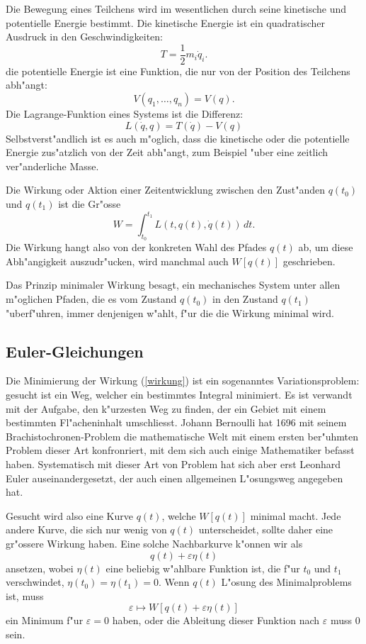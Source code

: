 Die Bewegung eines Teilchens wird im wesentlichen durch seine 
kinetische und potentielle Energie bestimmt. Die kinetische Energie
ist ein quadratischer Ausdruck in den Geschwindigkeiten:
\[
T=\frac12m_i\dot q_i.
\]
die potentielle Energie ist eine Funktion, die nur von der
Position des Teilchens abh"angt:
\[
V(q_1,\dots,q_n)=V(q).
\]
Die Lagrange-Funktion eines Systems ist die Differenz:
\[
L(\dot q, q) = T(\dot q) - V(q)
\]
Selbstverst"andlich ist es auch m"oglich, dass die kinetische oder
die potentielle Energie
zus"atzlich von der Zeit abh"angt, zum Beispiel "uber eine
zeitlich ver"anderliche Masse.

Die Wirkung oder Aktion einer Zeitentwicklung zwischen den Zust"anden
$q(t_0)$ und $q(t_1)$ ist die Gr"osse
\begin{equation}
W=\int_{t_0}^{t_1} L(t, q(t), \dot q(t))\,dt.
\label{wirkung}
\end{equation}
Die Wirkung hangt also von der konkreten Wahl des Pfades $q(t)$ ab,
um diese Abh"angigkeit auszudr"ucken, wird manchmal auch $W[q(t)]$
geschrieben.

Das Prinzip minimaler Wirkung besagt, ein mechanisches System unter
allen m"oglichen Pfaden, die es vom Zustand $q(t_0)$ in den Zustand
$q(t_1)$ "uberf"uhren, immer denjenigen w"ahlt, f"ur die die
Wirkung minimal wird.

\subsection{Euler-Gleichungen}
Die Minimierung der Wirkung (\ref{wirkung}) ist ein sogenanntes
Variationsproblem: gesucht ist ein Weg, welcher ein bestimmtes
Integral minimiert. Es ist verwandt mit der Aufgabe, den k"urzesten
Weg zu finden, der ein Gebiet mit einem bestimmten Fl"acheninhalt
umschliesst. Johann Bernoulli hat 1696 mit seinem Brachistochronen-Problem
die mathematische Welt mit einem ersten ber"uhmten Problem dieser Art
konfronriert, mit dem sich auch einige Mathematiker befasst haben.
Systematisch mit dieser Art von Problem hat sich aber erst Leonhard
Euler auseinandergesetzt, der auch einen allgemeinen L"osungsweg angegeben hat.

Gesucht wird also eine Kurve $q(t)$, welche $W[q(t)]$ minimal macht.
Jede andere Kurve, die sich nur wenig von $q(t)$ unterscheidet, sollte
daher eine gr"ossere Wirkung haben. Eine solche Nachbarkurve k"onnen
wir als
\[
q(t) + \varepsilon \eta(t)
\]
ansetzen, wobei $\eta(t)$ eine beliebig w"ahlbare Funktion ist,
die f"ur $t_0$ und $t_1$ verschwindet, $\eta(t_0)=\eta(t_1)=0$.
Wenn $q(t)$ L"osung des Minimalproblems ist, muss
\begin{equation}
\varepsilon\mapsto W[q(t)+\varepsilon\eta(t)]
\label{variation-ansatz}
\end{equation}
ein Minimum f"ur $\varepsilon=0$ haben, oder die Ableitung
dieser Funktion nach $\varepsilon$ muss $0$ sein.

